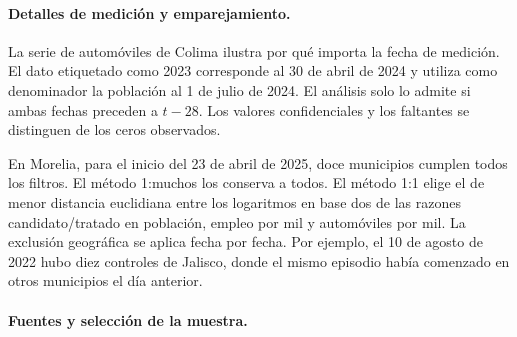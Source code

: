 \documentclass[11pt,letterpaper]{article}
\begin{document}
\paragraph{Detalles de medición y emparejamiento.}

La serie de automóviles de Colima ilustra por qué importa la fecha de medición. El dato etiquetado como 2023 corresponde al 30 de abril de 2024 y utiliza como denominador la población al 1 de julio de 2024. El análisis solo lo admite si ambas fechas preceden a $t-28$. Los valores confidenciales y los faltantes se distinguen de los ceros observados.\par

En Morelia, para el inicio del 23 de abril de 2025, doce municipios cumplen todos los filtros. El método 1:muchos los conserva a todos. El método 1:1 elige el de menor distancia euclidiana entre los logaritmos en base dos de las razones candidato/tratado en población, empleo por mil y automóviles por mil. La exclusión geográfica se aplica fecha por fecha. Por ejemplo, el 10 de agosto de 2022 hubo diez controles de Jalisco, donde el mismo episodio había comenzado en otros municipios el día anterior.\par

\paragraph{Fuentes y selección de la muestra.}
\end{document}
